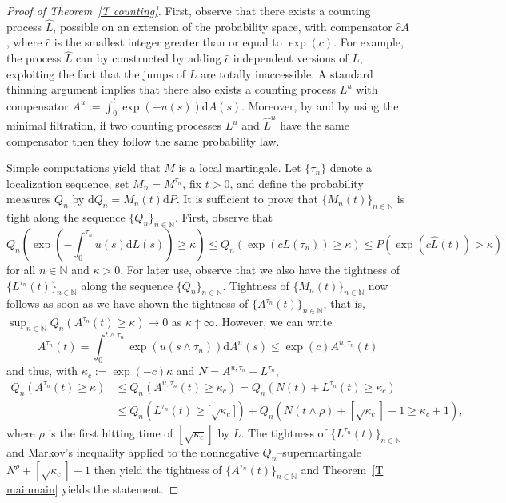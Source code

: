 \begin{proof}[Proof of Theorem~\ref{T counting}]
First, observe that there exists a counting process $\widehat{L}$, possible
on an extension of the probability space, with compensator $\widehat{c}A$,
where $\widehat{c}$ is the smallest integer greater than or equal to $\exp
(c)$. For example, the process $\widehat{L}$ can by constructed by adding $%
\widehat{c}$ independent versions of $L$, exploiting the fact that the jumps
of $L$ are totally inaccessible. A standard thinning argument implies that
there also exists a counting process $L^{u}$ with compensator $%
A^{u}:=\int_{0}^{t}\exp (-u(s))\mathrm{d}A(s)$. Moreover, by %
\citet{Jacod_1975} and by using the minimal filtration, if two counting
processes $L^{u}$ and $\widehat{L}^{u}$ have the same compensator then they
follow the same probability law.

Simple computations yield that $M$ is a local martingale. Let $\{\tau _{n}\}$
denote a localization sequence, set $M_{n}=M^{\tau _{n}}$, fix $t>0$, and
define the probability measures $Q_{n}$ by $\mathrm{d}Q_{n}=M_{n}(t)\mathrm{d%
}P$. It is sufficient to prove that $\{M_{n}(t)\}_{n\in \mathbb{N}}$ is
tight along the sequence $\{Q_{n}\}_{n\in \mathbb{N}}$. First, observe that
\begin{equation*}
Q_{n}\left( \exp \left( -\int_{0}^{\tau _{n}}u(s)\mathrm{d}L(s)\right) \geq
\kappa \right) \leq Q_{n}\left( \exp \left( cL(\tau _{n})\right) \geq \kappa
\right) \leq P\left( \exp (c\widehat{L}(t))>\kappa \right)
\end{equation*}%
for all $n\in \mathbb{N}$ and $\kappa >0$. For later use, observe that we
also have the tightness of $\{L^{\tau _{n}}(t)\}_{n\in \mathbb{N}}$ along
the sequence $\{Q_{n}\}_{n\in \mathbb{N}}$. Tightness of $\{M_{n}(t)\}_{n\in
\mathbb{N}}$ now follows as soon as we have shown the tightness of $%
\{A^{\tau _{n}}(t)\}_{n\in \mathbb{N}}$, that is, $\sup_{n\in \mathbb{N}%
}Q_{n}(A^{\tau _{n}}(t)\geq \kappa )\rightarrow 0$ as $\kappa \uparrow
\infty $. However, we can write
\begin{equation*}
A^{\tau _{n}}(t)=\int_{0}^{t\wedge \tau _{n}}\exp (u(s\wedge \tau _{n}))%
\mathrm{d}A^{u}(s)\leq \exp (c)A^{u,\tau _{n}}(t)
\end{equation*}%
and thus, with $\kappa _{c}:=\exp (-c)\kappa $ and $N=A^{u,\tau
_{n}}-L^{\tau _{n}}$,
\begin{align*}
Q_{n}\left( A^{\tau _{n}}(t)\geq \kappa \right) & \leq Q_{n}\left( A^{u,\tau
_{n}}(t)\geq \kappa _{c}\right) =Q_{n}\left( N(t)+L^{\tau _{n}}(t)\geq
\kappa _{c}\right)  \\
& \leq Q_{n}\left( L^{\tau _{n}}(t)\geq \lbrack \sqrt{\kappa _{c}}]\right)
+Q_{n}\left( N(t\wedge \rho )+[\sqrt{\kappa _{c}}]+1\geq \kappa _{c}+1\right) ,
\end{align*}%
where $\rho $ is the first hitting time of $[\sqrt{\kappa _{c}}]$ by $L$.
The tightness of $\{L^{\tau _{n}}(t)\}_{n\in \mathbb{N}}$ and Markov's
inequality applied to the nonnegative $Q_{n}$--supermartingale $N^{\rho }+[%
\sqrt{\kappa _{c}}]+1$ then yield the tightness of $\{A^{\tau
_{n}}(t)\}_{n\in \mathbb{N}}$ and Theorem~\ref{T mainmain} yields the
statement.
\end{proof}

